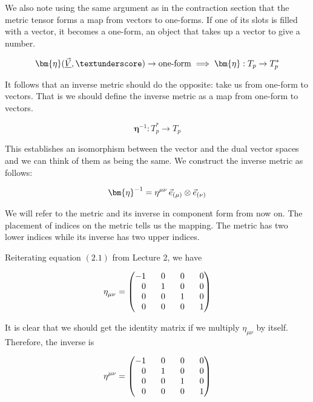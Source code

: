 \documentclass[11pt]{article}
\begin{document}
We also note using the same argument as in the contraction section that the metric tensor forms a map from vectors to one-forms. If one of its slots is filled with a vector, it becomes a one-form, an object that takes up a vector to give a number.

$$\bm{\eta}(\underline{\vec{V}}, \textunderscore) \rightarrow \text{one-form}\implies\bm{\eta}: T_p \rightarrow T_p^*$$

It follows that an inverse metric should do the opposite: take us from one-form to vectors. That is we should define the inverse metric as a map from one-form to vectors.

$$\bm{\eta}^{-1}: T_p^* \rightarrow T_p$$

This establishes an isomorphism between the vector and the dual vector spaces and we can think of them as being the same. We construct the inverse metric as follows:

\begin{equation}
\bm{\eta}^{-1}=\tensor{\eta}{^\mu^\nu}\, \vec{e}_{\left(\mu\right)}\otimes\vec{e}_{\left(\nu\right)}
\end{equation}

We will refer to the metric and its inverse in component form from now on. The placement of indices on the metric tells us the mapping. The metric has two lower indices while its inverse has two upper indices.

Reiterating equation $(2.1)$ from Lecture 2, we have

\begin{equation}
\tensor{\eta}{_\mu_\nu}=
\begin{pmatrix}
-1 & \phantom{-}0 & \phantom{-}0 & \phantom{-}0 \\
\phantom{-}0 & \phantom{-}1 & \phantom{-}0 & \phantom{-}0 \\
\phantom{-}0 & \phantom{-}0 & \phantom{-}1 & \phantom{-}0 \\
\phantom{-}0 & \phantom{-}0 & \phantom{-}0 & \phantom{-}1
\end{pmatrix}
\end{equation}

It is clear that we should get the identity matrix if we multiply $\eta_{\mu\nu}$ by itself. Therefore, the inverse is

\begin{equation}
\tensor{\eta}{^\mu^\nu}=
\begin{pmatrix}
-1 & \phantom{-}0 & \phantom{-}0 & \phantom{-}0 \\
\phantom{-}0 & \phantom{-}1 & \phantom{-}0 & \phantom{-}0 \\
\phantom{-}0 & \phantom{-}0 & \phantom{-}1 & \phantom{-}0 \\
\phantom{-}0 & \phantom{-}0 & \phantom{-}0 & \phantom{-}1
\end{pmatrix}
\end{equation}
\end{document}
